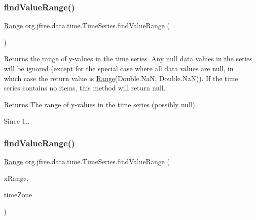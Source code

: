 \subsubsection{\texorpdfstring{find\+Value\+Range()}{findValueRange()}\hspace{0.1cm}{\footnotesize\ttfamily [1/3]}}
{\footnotesize\ttfamily \mbox{\hyperlink{classorg_1_1jfree_1_1data_1_1_range}{Range}} org.\+jfree.\+data.\+time.\+Time\+Series.\+find\+Value\+Range (\begin{DoxyParamCaption}{ }\end{DoxyParamCaption})}

Returns the range of y-\/values in the time series. Any {\ttfamily null} data values in the series will be ignored (except for the special case where all data values are {\ttfamily null}, in which case the return value is {\ttfamily \mbox{\hyperlink{classorg_1_1jfree_1_1data_1_1_range}{Range}}(Double.\+NaN, Double.\+NaN)}). If the time series contains no items, this method will return {\ttfamily null}.

\begin{DoxyReturn}{Returns}
The range of y-\/values in the time series (possibly {\ttfamily null}).
\end{DoxyReturn}
\begin{DoxySince}{Since}
1.. 
\end{DoxySince}
\mbox{\label{classorg_1_1jfree_1_1data_1_1time_1_1_time_series_a95cf979396bdbd79d826679594769d1d}} 
\subsubsection{\texorpdfstring{find\+Value\+Range()}{findValueRange()}\hspace{0.1cm}{\footnotesize\ttfamily [2/3]}}
{\footnotesize\ttfamily \mbox{\hyperlink{classorg_1_1jfree_1_1data_1_1_range}{Range}} org.\+jfree.\+data.\+time.\+Time\+Series.\+find\+Value\+Range (\begin{DoxyParamCaption}\item[{\mbox{\hyperlink{classorg_1_1jfree_1_1data_1_1_range}{Range}}}]{x\+Range,  }\item[{Time\+Zone}]{time\+Zone }\end{DoxyParamCaption})}

